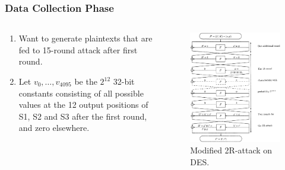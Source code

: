 \documentclass{beamer}
\begin{document}
    \begin{frame}
        \frametitle{Data Collection Phase}
        \begin{columns}
            \begin{column}{0.5\linewidth}
                \begin{enumerate}
                    \item<1-> Want to generate plaintexts that are fed to
                    15-round attack after first round.
                    \item<2-> Let \(v_0, \ldots, v_{4095}\) be the \(2^{12}\)
                    32-bit constants consisting of all possible values at the 12
                    output positions of S1, S2 and S3 after the first round, and
                    zero elsewhere.
                \end{enumerate}
            \end{column} 
            \begin{column}{0.5\linewidth}
                \begin{figure}[!ht]
                    \centering
                    \includegraphics[height=0.65\textheight]{images/des_new_attack.png}
                    \caption{Modified 2R-attack on DES.}
                    \label{fig:des-new}
                \end{figure}
            \end{column}
        \end{columns}
    \end{frame}
\end{document}
